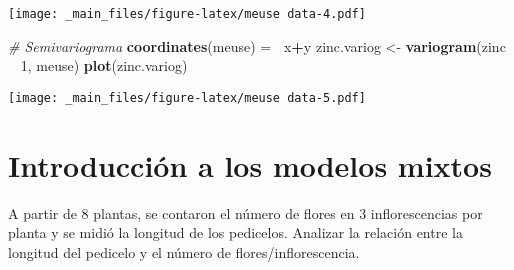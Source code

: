 \documentclass[
]{book}
\newenvironment{Shaded}{\begin{snugshade}}{\end{snugshade}}
\newcommand{\CommentTok}[1]{\textcolor[rgb]{0.56,0.35,0.01}{\textit{#1}}}
\newcommand{\DecValTok}[1]{\textcolor[rgb]{0.00,0.00,0.81}{#1}}
\newcommand{\ErrorTok}[1]{\textcolor[rgb]{0.64,0.00,0.00}{\textbf{#1}}}
\newcommand{\KeywordTok}[1]{\textcolor[rgb]{0.13,0.29,0.53}{\textbf{#1}}}
\newcommand{\NormalTok}[1]{#1}
\newcommand{\OperatorTok}[1]{\textcolor[rgb]{0.81,0.36,0.00}{\textbf{#1}}}
\newcommand{\StringTok}[1]{\textcolor[rgb]{0.31,0.60,0.02}{#1}}
\begin{document}
\texttt{[image: \_main\_files/figure-latex/meuse data-4.pdf]}

\begin{Shaded}
\begin{Highlighting}[]
\CommentTok{# Semivariograma}
\KeywordTok{coordinates}\NormalTok{(meuse) =}\StringTok{ }\ErrorTok{~}\NormalTok{x}\OperatorTok{+}\NormalTok{y}
\NormalTok{zinc.variog <-}\StringTok{ }\KeywordTok{variogram}\NormalTok{(zinc }\OperatorTok{~}\StringTok{ }\DecValTok{1}\NormalTok{, meuse)}
\KeywordTok{plot}\NormalTok{(zinc.variog)}
\end{Highlighting}
\end{Shaded}

\texttt{[image: \_main\_files/figure-latex/meuse data-5.pdf]}

\hypertarget{introducciuxf3n-a-los-modelos-mixtos}{%
\section{Introducción a los modelos mixtos}\label{introducciuxf3n-a-los-modelos-mixtos}}

A partir de 8 plantas, se contaron el número de flores en 3 inflorescencias por planta y se midió la longitud de los pedicelos. Analizar la relación entre la longitud del pedicelo y el número de flores/inflorescencia.
\end{document}
